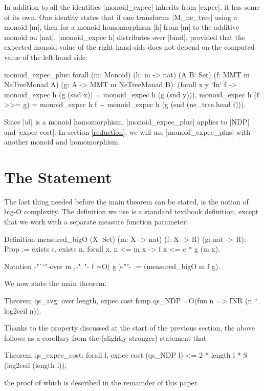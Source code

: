 \documentclass[runningheads]{llncs}
\begin{document}
In addition to all the identities |monoid_expec| inherits from |expec|, it has some of its own. One identity states that if one transforms |M_ne_tree| using a monoid |m|, then for a monoid homomorphism |h| from |m| to the additive monoid on |nat|, |monoid_expec h| distributes over |bind|, provided that the expected monoid value of the right hand side does not depend on the computed value of the left hand side:

\parbox{\textwidth}{\begin{code}
  monoid_expec_plus: forall (m: Monoid) (h: m -> nat) (A B: Set)
    (f: MMT m NeTreeMonad A) (g: A -> MMT m NeTreeMonad B):
    (forall x y `In` f -> monoid_expec h (g (snd x)) = monoid_expec h (g (snd y))),
    monoid_expec h (f >>= g) =
      monoid_expec h f + monoid_expec h (g (snd (ne_tree.head f))).
\end{code}}

Since |id| is a monoid homomorphism, |monoid_expec_plus| applies to |NDP| and |expec cost|. In section \ref{reduction}, we will use |monoid_expec_plus| with another monoid and homomorphism.

\section{The Statement}
\label{statement}

The last thing needed before the main theorem can be stated, is the notion of big-O complexity. The definition we use is a standard textbook definition, except that we work with a separate measure function parameter:

\parbox{\textwidth}{\begin{code}
  Definition measured_bigO (X: Set)
    (m: X -> nat) (f: X -> R) (g: nat -> R): Prop
      := exists c, exists n, forall x, n <= m x -> f x <= c * g (m x).

  Notation {-"``"-}over m ,{-"\ "-} f =O( g ){-""-} := (measured_bigO m f g).
\end{code}}
We now state the main theorem.
\begin{code}
  Theorem qs_avg: over length,
    expec cost fcmp qs_NDP =O(fun n => INR (n * log2ceil n)).
\end{code}
Thanks to the property discussed at the start of the previous section, %
the above follows as a corollary from the (slightly stronger) statement that
\begin{code}
  Theorem qs_expec_cost:
    forall l, expec cost (qs_NDP l) <= 2 * length l * S (log2ceil (length l)),
\end{code}
the proof of which is described in the remainder of this paper.
\end{document}
